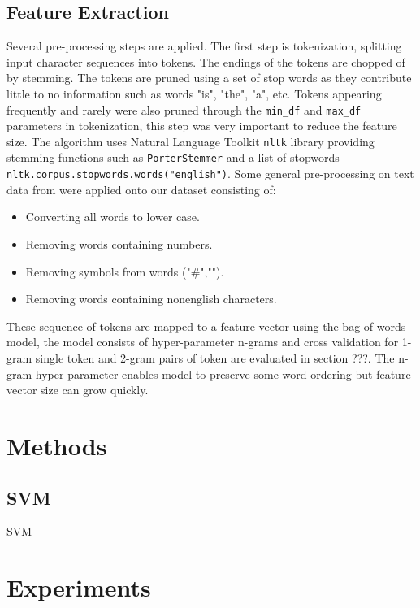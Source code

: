 \documentclass[transmag]{IEEEtran}
\begin{document}
\subsection{Feature Extraction}

Several pre-processing steps are applied. The first step is tokenization, splitting input character sequences into tokens. The endings of the tokens are chopped of by stemming. The tokens are pruned using a set of stop words as they contribute little to no information such as words "is", "the", "a", etc. Tokens appearing frequently and rarely were also pruned through the \verb|min_df| and \verb|max_df| parameters in tokenization, this step was very important to reduce the feature size. The algorithm uses Natural Language Toolkit \verb|nltk| library providing stemming functions such as \verb|PorterStemmer| and a list of stopwords \verb|nltk.corpus.stopwords.words("english")|. Some general pre-processing on text data from \cite{sattarov2020forecasting} were applied onto our dataset consisting of:
\begin{itemize}
  \item Converting all words to lower case.
  \item Removing words containing numbers.
  \item Removing symbols from words ("\#","\@@").
  \item Removing words containing non\-english characters.
\end{itemize}

These sequence of tokens are mapped to a feature vector using the bag of words model, the model consists of hyper-parameter n-grams and cross validation for 1-gram single token and 2-gram pairs of token are evaluated in section ???. The n-gram hyper-parameter enables model to preserve some word ordering but feature vector size can grow quickly.

\section{Methods}

\subsection{SVM}
SVM 

\subsection{}

\section{Experiments}
\end{document}
